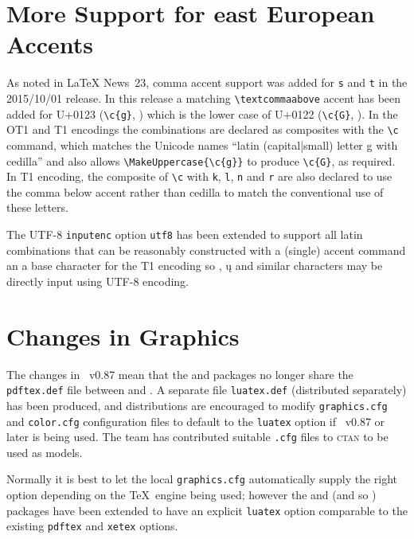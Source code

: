 \documentclass{ltnews}
\begin{document}
\section{More Support for east European Accents}

As noted in \LaTeX{} News~23, comma accent support was added for \texttt{s} and
\texttt{t} in the 2015/10/01 release. In this release a matching
\verb|\textcommaabove| accent has been added for U+0123 (\verb|\c{g}|,
) which is the lower case of U+0122 (\verb|\c{G}|,
).  In the OT1 and T1 encodings the combinations are
declared as composites with the \verb|\c| command, which matches the
Unicode names ``\textsf{latin (capital|small) letter g with cedilla}'' and
also allows \verb|\MakeUppercase{\c{g}}| to produce \verb|\c{G}|, as
required.  In T1 encoding, the composite of \verb|\c| with \texttt{k}, \texttt{l},
\texttt{n} and \texttt{r} are also
declared to use the comma below accent rather than cedilla to match the
conventional use of these letters.

The UTF-8 \texttt{inputenc} option \texttt{utf8} has been extended to
support all latin combinations that can be reasonably constructed with a
(single) accent command an a base character for the T1 encoding so
, \k{u} and similar characters may be directly input
using UTF-8 encoding.

\section{Changes in Graphics}

The changes in ~v0.87 mean that the  and
 packages no longer share the \texttt{pdftex.def} file
between  and . A separate file
\texttt{luatex.def} (distributed separately) has been produced, and
distributions are encouraged to modify \texttt{graphics.cfg} and
\texttt{color.cfg} configuration files to default to the \texttt{luatex}
option if ~v0.87 or later is being used. The team has
contributed suitable \texttt{.cfg} files to \textsc{ctan} to be used
as models.

Normally it is best to let the local \texttt{graphics.cfg}
automatically supply the right option depending on the \TeX\ engine
being used; however the  and  (and so
) packages have been extended to have an explicit
\texttt{luatex} option comparable to the existing \texttt{pdftex} and
\texttt{xetex} options.
\end{document}
